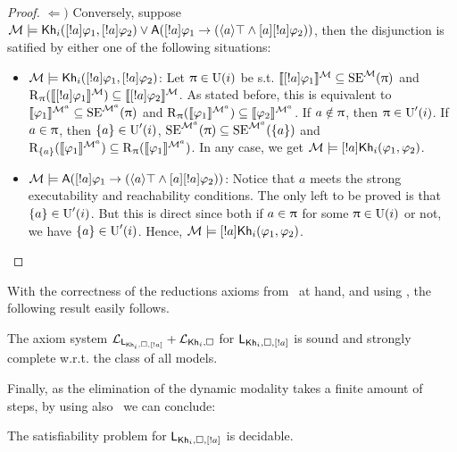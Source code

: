 \begin{proof}
$\Leftarrow)$ Conversely, suppose $\modults \models \khi(\srefbox{a} \varphi_1,\srefbox{a} \varphi_2) \vee \A(\srefbox{a} \varphi_1 \ra (\mldiam{a}\top \wedge \mlbox{a} \srefbox{a}\varphi_2))$, then the disjunction is satified by either one of the following situations:
\begin{itemize}
    \item $\modults \models \khi(\srefbox{a} \varphi_1,\srefbox{a} \varphi_2)$: Let $\plans \in \Unc(i)$ be s.t. $\truthset{\modults}{\srefbox{a}\varphi_1} \subseteq \stexec^\modults(\plans)$ and $\R_\plans(\truthset{\modults}{\srefbox{a}\varphi_1}) \subseteq \truthset{\modults}{\srefbox{a}\varphi_2}$.
    As stated before, this is equivalent to $\truthset{\modults^a}{\varphi_1} \subseteq \stexec^{\modults^a}(\plans)$ and $\R_\plans(\truthset{\modults^a}{\varphi_1}) \subseteq \truthset{\modults^a}{\varphi_2}$.
    If $a \notin \plans$, then $\plans \in \Unc'(i)$.
    If $a \in \plans$, then $\set{a} \in \Unc'(i)$, $\stexec^{\modults^a}(\plans) \subseteq \stexec^{\modults^a}(\set{a})$ and $\R_{\set{a}}(\truthset{\modults^a}{\varphi_1}) \subseteq \R_\plans(\truthset{\modults^a}{\varphi_1})$. In any case, we get $\modults \models \srefbox{a}\khi(\varphi_1,\varphi_2)$.

    \item $\modults \models \A(\srefbox{a} \varphi_1 \ra (\mldiam{a}\top \wedge \mlbox{a} \srefbox{a}\varphi_2))$: Notice that $a$ meets the strong executability and reachability conditions.
    The only left to be proved is that $\set{a} \in \Unc'(i)$. But this is direct since both if $a \in \plans$ for some $\plans \in \Unc(i)$ or not, we have $\set{a} \in \Unc'(i)$. Hence,  $\modults \models \srefbox{a}\khi(\varphi_1,\varphi_2)$.
\end{itemize}
\end{proof}

With the correctness of the reductions axioms from~ at hand, and using , the following result easily follows.

\medskip 

\begin{theorem}\label{th:sscomplete}
The axiom system $\axset_{\AtomReflogic}+\axset_{\khi,\square}$ for $\AtomReflogic$ is sound and strongly complete w.r.t. the class of all models.
\end{theorem}

\medskip 

Finally, as the elimination of the dynamic modality takes a finite amount of steps, by using also~ we can conclude:

\medskip 

\begin{corollary}
The satisfiability problem for $\AtomReflogic$ is decidable.
\end{corollary} 
